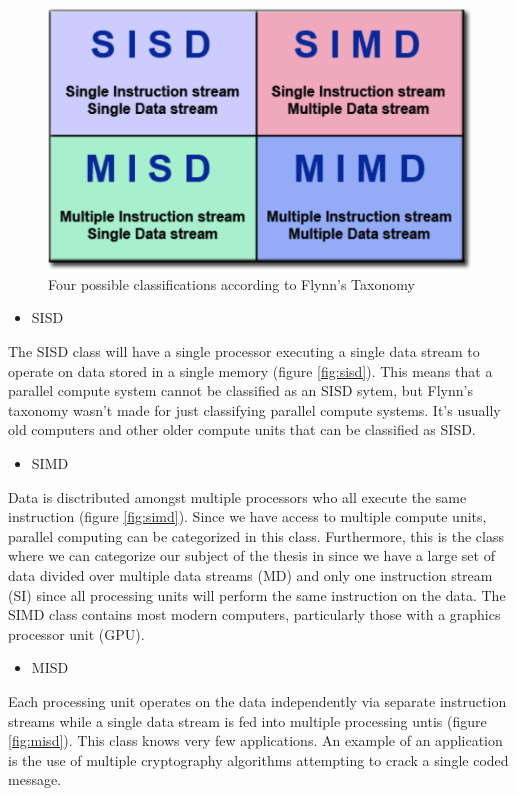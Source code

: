 \documentclass[a4paper, 11pt]{report}
\begin{document}
	\begin{figure}[h]
		\centering
		\includegraphics[scale=.5]{images/flynnsTaxonomy.pdf}
		\caption{Four possible classifications according to Flynn's Taxonomy}
		\label{fig:flynnTaxonomy}
	\end{figure}
	
	\begin{itemize}
		\item SISD
	\end{itemize}
The SISD class will have a single processor executing a single data stream to operate on data stored in a single memory (figure \ref{fig:sisd}). This means that a parallel compute system cannot be classified as an SISD sytem, but Flynn's taxonomy wasn't made for just classifying parallel compute systems. It's usually old computers and other older compute units that can be classified as SISD.
	\begin{itemize}
		\item SIMD
	\end{itemize}
Data is disctributed amongst multiple processors who all execute the same instruction (figure \ref{fig:simd}). Since we have access to multiple compute units, parallel computing can be categorized in this class. Furthermore, this is the class where we can categorize our subject of the thesis in since we have a large set of data divided over multiple data streams (MD) and only one instruction stream (SI) since all processing units will perform the same instruction on the data. The SIMD class contains most modern computers, particularly those with a graphics processor unit (GPU).

	\begin{itemize}
		\item MISD
	\end{itemize}
Each processing unit operates on the data independently via separate instruction streams while a single data stream is fed into multiple processing untis (figure \ref{fig:misd}). This class knows very few applications. An example of an application is the use of multiple cryptography algorithms attempting to crack a single coded message.
	
\end{document}
